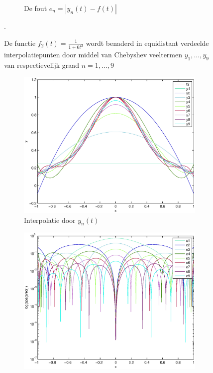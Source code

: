 \documentclass[a4paper]{article}
\begin{document}
\begin{figure}
\begin{subfigure}[t]{\textwidth}
        \caption{De fout $e_{n} = |y_{n}(t)-f(t)|$}
        \label{fig:lin_f2_error}
    \end{subfigure}
    \hfill
    \caption{De functie $f_{2}(t) = \frac{1}{1+6t^{2}}$ wordt benaderd in equidistant verdeelde interpolatiepunten door middel van Chebyshev veeltermen $y_{1},\dots,y_{9}$ van respectievelijk graad $n=1,\dots,9$}\label{fig:lin_f2}.
\end{figure}

\begin{figure}
    \centering
    \begin{subfigure}[t]{\textwidth}
        \centering
        \includegraphics[width=\textwidth]{Jona/cheby_f2_interpolation.eps}
        \caption{Interpolatie door $y_{n}(t)$}
        \label{fig:cheb_f2_interpol}
    \end{subfigure}
    \begin{subfigure}[t]{\textwidth}
        \centering
        \includegraphics[width=\textwidth]{Jona/cheby_f2_error.eps}

\end{subfigure}
\end{figure}
\end{document}
